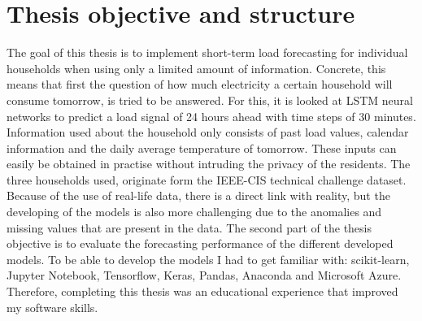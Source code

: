 \section{Thesis objective and structure}
The goal of this thesis is to implement short-term load forecasting for individual households when using only a limited amount of information. Concrete, this means that first the question of how much electricity a certain household will consume tomorrow, is tried to be answered. For this, it is looked at LSTM neural networks to predict a load signal of 24 hours ahead with time steps of 30 minutes. Information used about the household only consists of past load values, calendar information and the daily average temperature of tomorrow. These inputs can easily be obtained in practise without intruding the privacy of the residents. The three households used, originate form the IEEE-CIS technical challenge dataset. Because of the use of real-life data, there is a direct link with reality, but the developing of the models is also more challenging due to the anomalies and missing values that are present in the data. The second part of the thesis objective is to evaluate the forecasting performance of the different developed models. To be able to develop the models I had to get familiar with: scikit-learn, Jupyter Notebook, Tensorflow, Keras, Pandas, Anaconda and Microsoft Azure. Therefore, completing this thesis was an educational experience that improved my software skills.\\ 


